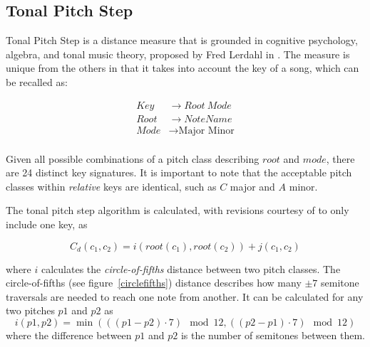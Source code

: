 \subsection{Tonal Pitch Step}

Tonal Pitch Step is a distance measure that is grounded in cognitive psychology, algebra, and tonal music theory, proposed by Fred Lerdahl in \cite{lerdahl1988tonal}. The measure is unique from the others in that it takes into account the key of a song, which can be recalled as:

\begin{align*}
Key &\to Root\ Mode \\
Root &\to NoteName \\
Mode &\to \text{Major Minor} \\
\end{align*}

Given all possible combinations of a pitch class describing $root$ and $mode$, there are 24 distinct key signatures. It is important to note that the acceptable pitch classes within \textit{relative} keys are identical, such as $C$ major and $A$ minor.

The tonal pitch step algorithm is calculated, with revisions courtesy of \cite{de2008tonal} to only include one key, as

\[ C_d(c_1, c_2) = i(root(c_1), root(c_2)) + j(c_1, c_2) \]

where $i$ calculates the \textit{circle-of-fifths} distance between two pitch classes. The circle-of-fifths (see figure~\ref{circlefifths}) distance describes how many $\pm7$ semitone traversals are needed to reach one note from another. It can be calculated for any two pitches $p1$ and $p2$ as \[i({p1}, {p2}) = \min((({p1} - {p2}) \cdot 7) \mod 12, (({p2} - {p1}) \cdot 7) \mod 12)\] where the difference between ${p1}$ and ${p2}$ is the number of semitones between them.
